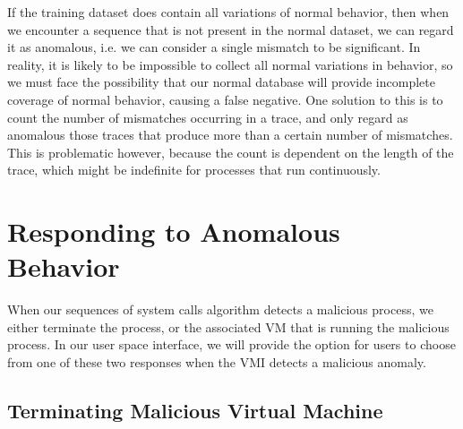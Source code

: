\documentclass{report}
\begin{document}
\begin{spacing}{1.5}
{\large
\noindent If the training dataset does contain all variations of normal behavior, then when we encounter a sequence that is not present in the normal dataset, we can regard it as anomalous, i.e. we can consider a single mismatch to be significant. In reality, it is likely to be impossible to collect all normal variations in behavior, so we must face the possibility that our normal database will provide incomplete coverage of normal behavior, causing a false negative. One solution to this is to count the number of mismatches occurring in a trace, and only regard as anomalous those traces that produce more than a certain number of mismatches. This is problematic however, because the count is dependent on the length of the trace, which might be indefinite for processes that run continuously.
\newline
}








































\section{Responding to Anomalous Behavior}

{\large
When our sequences of system calls algorithm detects a malicious process, we either terminate the process, or the associated VM that is running the malicious process. In our user space interface, we will provide the option for users to choose from one of these two responses when the VMI detects a malicious anomaly. 
\newline
}

\subsection{Terminating Malicious Virtual Machine}


\end{spacing}
\end{document}

